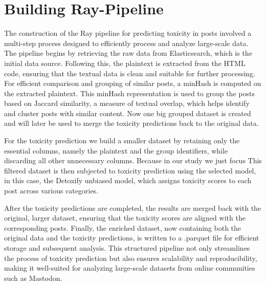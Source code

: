 \chapter{Building Ray-Pipeline} \label{ray-pipeline}

The construction of the Ray pipeline for predicting toxicity in posts involved a multi-step process designed to efficiently process and analyze large-scale data. The pipeline begins by retrieving the raw data from Elasticsearch, which is the initial data source. Following this, the plaintext is extracted from the HTML code, ensuring that the textual data is clean and suitable for further processing. For efficient comparison and grouping of similar posts, a minHash is computed on the extracted plaintext. This minHash representation is used to group the posts based on Jaccard similarity, a measure of textual overlap, which helps identify and cluster posts with similar content. Now one big grouped dataset is created and will later be used to merge the toxicity predictions back to the original data.

For the toxicity prediction we build a smaller dataset by retaining only the essential columns, namely the plaintext and the group identifiers, while discarding all other unnecessary columns. Because in our study we just focus This filtered dataset is then subjected to toxicity prediction using the selected model, in this case, the Detoxify unbiased model, which assigns toxicity scores to each post across various categories.

After the toxicity predictions are completed, the results are merged back with the original, larger dataset, ensuring that the toxicity scores are aligned with the corresponding posts. Finally, the enriched dataset, now containing both the original data and the toxicity predictions, is written to a .parquet file for efficient storage and subsequent analysis. This structured pipeline not only streamlines the process of toxicity prediction but also ensures scalability and reproducibility, making it well-suited for analyzing large-scale datasets from online communities such as Mastodon.